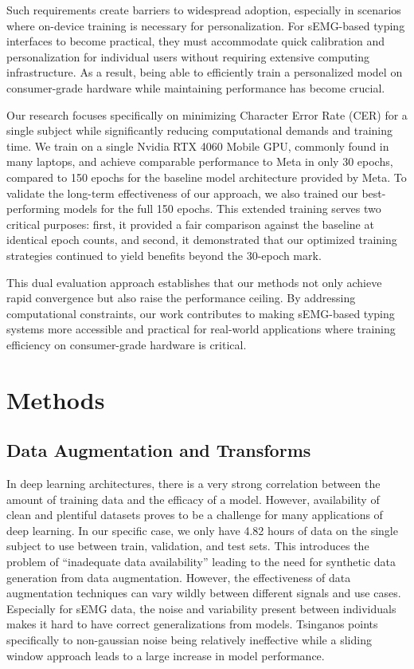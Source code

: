 \documentclass{article}
\begin{document}
Such requirements create barriers to widespread adoption, especially in scenarios where on-device training is necessary for personalization. For sEMG-based typing interfaces to become practical, they must accommodate quick calibration and personalization for individual users without requiring extensive computing infrastructure. As a result, being able to efficiently train a personalized model on consumer-grade hardware while maintaining performance has become crucial. 

Our research focuses specifically on minimizing Character Error Rate (CER) for a single subject while significantly reducing computational demands and training time. We train on a single Nvidia RTX 4060 Mobile GPU, commonly found in many laptops, and achieve comparable performance to Meta in only 30 epochs, compared to 150 epochs for the baseline model architecture provided by Meta. To validate the long-term effectiveness of our approach, we also trained our best-performing models for the full 150 epochs. This extended training serves two critical purposes: first, it provided a fair comparison against the baseline at identical epoch counts, and second, it demonstrated that our optimized training strategies continued to yield benefits beyond the 30-epoch mark.

This dual evaluation approach establishes that our methods not only achieve rapid convergence but also raise the performance ceiling. By addressing computational constraints, our work contributes to making sEMG-based typing systems more accessible and practical for real-world applications where training efficiency on consumer-grade hardware is critical.


\section{Methods}

\subsection{Data Augmentation and Transforms}

In deep learning architectures, there is a very strong correlation between the amount of training data and the efficacy of a model. However, availability of clean and plentiful datasets proves to be a challenge for many applications of deep learning. In our specific case, we only have 4.82 hours of data on the single subject to use between train, validation, and test sets. This introduces the problem of “inadequate data availability” \citet{tsinganos} leading to the need for synthetic data generation from data augmentation. However, the effectiveness of data augmentation techniques can vary wildly between different signals and use cases. Especially for sEMG data, the noise and variability present between individuals makes it hard to have correct generalizations from models. Tsinganos points specifically to non-gaussian noise being relatively ineffective while a sliding window approach leads to a large increase in model performance.
\end{document}
